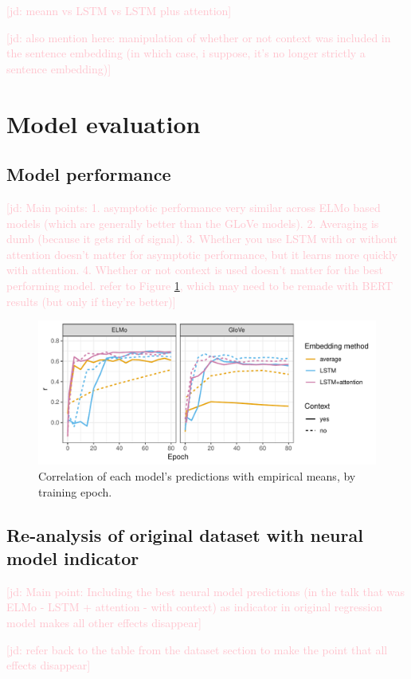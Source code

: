\documentclass[10pt,letterpaper]{article}
\newcommand{\jd}[1]{\textcolor{Pink}{[jd: #1]}}
\newcommand{\figref}[1]{Figure \ref{#1}}
\begin{document}
\jd{meann vs LSTM vs LSTM plus attention}

\jd{also mention here: manipulation of whether or not context was included in the sentence embedding (in which case, i suppose, it's no longer strictly a sentence embedding)}

\section{Model evaluation}

\subsection{Model performance}

\jd{Main points: 1. asymptotic performance very similar across ELMo based models (which are generally better than the GLoVe models). 2. Averaging is dumb (because it gets rid of signal). 3. Whether you use LSTM with or without attention doesn't matter for asymptotic performance, but it learns more quickly with attention. 4. Whether or not context is used doesn't matter for the best performing model. refer to \figref{fig:modelperformance}, which may need to be remade with BERT results (but only if they're better)}

\begin{figure}
	\includegraphics[width=.5\textwidth]{../models/graphs/model_performance_epoch80_6}
	\caption{Correlation of each model's predictions with empirical means, by training epoch.}
	\label{fig:modelperformance}
\end{figure}

\subsection{Re-analysis of original dataset with neural model indicator}

\jd{Main point: Including the best neural model predictions (in the talk that was ELMo - LSTM + attention - with context) as indicator in original regression model makes all other effects disappear}
 
\jd{refer back to the table from the dataset section to make the point that all effects disappear}
\end{document}
